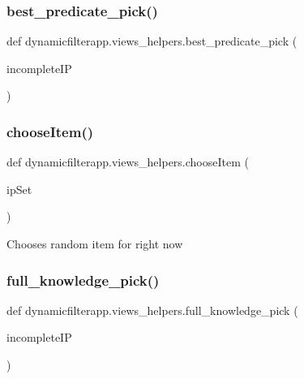\subsubsection{\texorpdfstring{best\_predicate\_pick()}{best\_predicate\_pick()}}
{\footnotesize\ttfamily def dynamicfilterapp.\+views\+\_\+helpers.\+best\+\_\+predicate\+\_\+pick (\begin{DoxyParamCaption}\item[{}]{incomplete\+IP }\end{DoxyParamCaption})}

\mbox{\label{namespacedynamicfilterapp_1_1views__helpers_ad1a6f030776f2f8bcaae48a4dda40665}} 
\subsubsection{\texorpdfstring{chooseItem()}{chooseItem()}}
{\footnotesize\ttfamily def dynamicfilterapp.\+views\+\_\+helpers.\+choose\+Item (\begin{DoxyParamCaption}\item[{}]{ip\+Set }\end{DoxyParamCaption})}

\begin{DoxyVerb}Chooses random item for right now
\end{DoxyVerb}
 \mbox{\label{namespacedynamicfilterapp_1_1views__helpers_a19a0b5e8e5ce5def8165fcd0558ca88d}} 
\subsubsection{\texorpdfstring{full\_knowledge\_pick()}{full\_knowledge\_pick()}}
{\footnotesize\ttfamily def dynamicfilterapp.\+views\+\_\+helpers.\+full\+\_\+knowledge\+\_\+pick (\begin{DoxyParamCaption}\item[{}]{incomplete\+IP }\end{DoxyParamCaption})}


